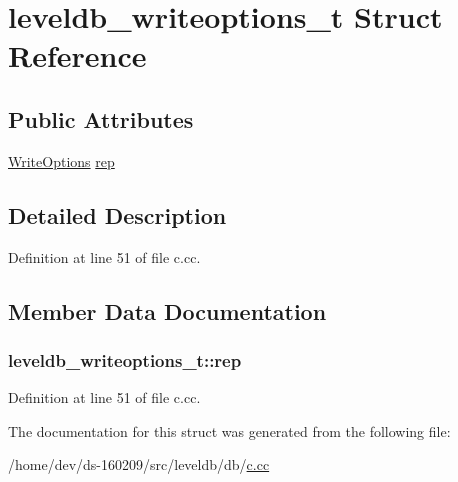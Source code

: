 \hypertarget{structleveldb__writeoptions__t}{}\section{leveldb\+\_\+writeoptions\+\_\+t Struct Reference}
\label{structleveldb__writeoptions__t}
\subsection*{Public Attributes}
\begin{DoxyCompactItemize}
\item 
\hyperlink{structleveldb_1_1_write_options}{Write\+Options} \hyperlink{structleveldb__writeoptions__t_ad51ccdc92007bd69dcb075bba4aef788}{rep}
\end{DoxyCompactItemize}


\subsection{Detailed Description}


Definition at line 51 of file c.\+cc.



\subsection{Member Data Documentation}
\hypertarget{structleveldb__writeoptions__t_ad51ccdc92007bd69dcb075bba4aef788}{}
\subsubsection[{rep}]{ leveldb\+\_\+writeoptions\+\_\+t\+::rep}\label{structleveldb__writeoptions__t_ad51ccdc92007bd69dcb075bba4aef788}


Definition at line 51 of file c.\+cc.



The documentation for this struct was generated from the following file\+:\begin{DoxyCompactItemize}
\item 
/home/dev/ds-\/160209/src/leveldb/db/\hyperlink{c_8cc}{c.\+cc}\end{DoxyCompactItemize}
